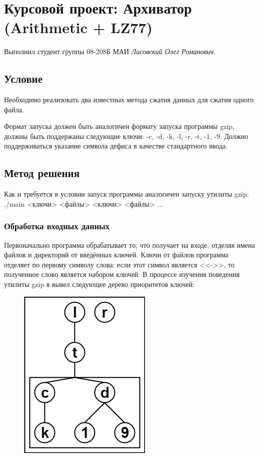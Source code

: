 \documentclass[12pt]{article}
\begin{document}
\section*{Курсовой проект: Архиватор (Arithmetic + LZ77)}%
\noindent
Выполнил студент группы 08-208Б МАИ \textit{Лисовский Олег Романович}.%

\subsection*{Условие}

Необходимо реализовать два известных метода сжатия данных для сжатия одного файла. 

Формат запуска должен быть аналогичен формату запуска программы gzip, должны быть поддержаны следующие ключи: -c, -d, -k, -l, -r, -t, -1, -9. Должно поддерживаться указание символа дефиса в качестве стандартного ввода.


\subsection*{Метод решения}

Как и требуется в условии запуск программы аналогичен запуску утилиты gzip: ./main <ключи> <файлы> <ключи> <файлы> ...

\subsubsection*{Обработка входных данных}

Первоначально программа обрабатывает то, что получает на входе, отделяя имена файлов и директорий от введённых ключей. Ключи от файлов программа отделяет по первому символу слова: если этот символ является <<->>, то полученное слово является набором ключей. В процессе изучения поведения утилиты gzip я вывел следующее дерево приоритетов ключей:

\begin{figure}[h!]
	\centering\includegraphics[scale=0.5]{KeyTree}
\end{figure}
\end{document}
